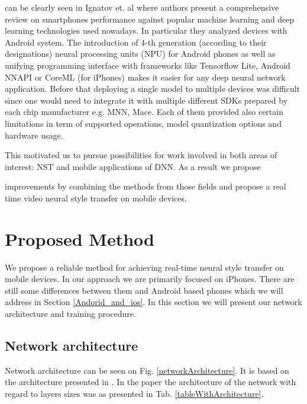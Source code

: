 \documentclass[a4paper,conference]{IEEEtran}
\begin{document}
can be clearly seen in Ignatov et. al\cite{aiMobileBenchmark} where authors present a comprehensive review on smartphones performance against popular machine learning and deep learning technologies used nowadays. In particular they analyzed devices with Android system. The introduction of 4-th generation (according to 
their designations) neural processing units (NPU) for Android phones as well as unifying programming interface with frameworks like Tensorflow Lite, Android NNAPI or CoreML (for iPhones) makes it easier for any deep neural network application. Before that deploying a single model to multiple devices was difficult since one would need to integrate it with multiple different SDKs prepared by each chip manufacturer e.g. MNN, Mace. Each of them provided also certain limitations in term of supported operations, model quantization options and hardware usage.

This motivated us to pursue possibilities for work involved in both areas of interest: NST and mobile applications of DNN. As a result we propose 

improvements by combining the methods from those fields and propose a real time video neural style transfer on mobile devices.


 
\section{Proposed Method}
\label{methods}

We propose a reliable method for achieving real-time neural style transfer on mobile devices. In our approach we are primarily focused on iPhones. There are still some differences between them and Android based phones which we will address in Section \ref{Andorid_and_ios}. In this section we will present our network architecture and training procedure. 

\subsection{Network architecture}

Network architecture can be seen on Fig. \ref{networkArchitecture}. It is based on the architecture presented in \cite{Reconet}. 
In the \cite{Reconet} paper the architecture of the network with regard to layers sizes was as presented in Tab. \ref{tableWithArchitecture}.
\end{document}
